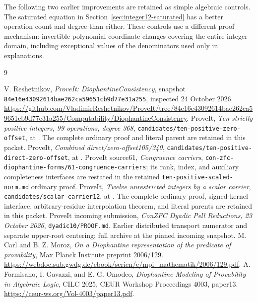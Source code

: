 \documentclass[11pt,letterpaper]{article}
\theoremstyle{remark}\newtheorem{remark}[theorem]{Remark}
\newcommand{\sha}{\texttt{84e16e43092614bae262ca59651cb9d77e31a255}}
\begin{document}
The following two earlier improvements are retained as simple algebraic
controls.  The saturated equation in Section~\ref{sec:integer12-saturated}
has a better operation count and degree than either.  These controls
use a different proof mechanism: invertible polynomial coordinate
changes covering the entire integer domain, including exceptional
values of the denominators used only in explanations.




\begin{thebibliography}{9}\raggedright
{} V. Reshetnikov, \emph{ProveIt: DiophantineConsistency},
snapshot \sha, inspected 24 October 2026.
\url{https://github.com/VladimirReshetnikov/ProveIt/tree/84e16e43092614bae262ca59651cb9d77e31a255/Computability/DiophantineConsistency}.
 ProveIt, \emph{Ten strictly positive integers, 99 operations,
degree 368}, \texttt{candidates/ten-positive-zero-offset}, at \cite{repo}.
The complete ordinary proof and literal parent are retained in this packet.
 ProveIt, \emph{Combined direct/zero-offset105/340},
\texttt{candidates/ten-positive-direct-zero-offset}, at \cite{repo}.
 ProveIt source61, \emph{Congruence carriers},
\texttt{con-zfc-diophantine-forms/61-congruence-carriers}; its rank,
index, and auxiliary completeness interfaces are restated in the retained
\texttt{ten-positive-scaled-norm.md} ordinary proof.
 ProveIt, \emph{Twelve unrestricted integers by a scalar carrier},
\texttt{candidates/scalar-carrier12}, at \cite{repo}.
The complete ordinary proof, signed-kernel interface, arbitrary-residue
interpolation theorem, and literal parents are retained in this packet.
 ProveIt incoming submission,
\emph{ConZFC Dyadic Pell Reductions, 23 October 2026},
\texttt{dyadic10/PROOF.md}.  Earlier distributed transport numerator and
separate upper-root centering; full archive at the pinned incoming snapshot.
 M. Carl and B. Z. Moroz,
\emph{On a Diophantine representation of the predicate of provability},
Max Planck Institute preprint 2006/129.
\url{https://webdoc.sub.gwdg.de/ebook/serien/e/mpi_mathematik/2006/129.pdf}.
 A. Formisano, I. Gavazzi, and E. G. Omodeo,
\emph{Diophantine Modeling of Provability in Algebraic Logic},
CILC 2025, CEUR Workshop Proceedings 4003, paper13.
\url{https://ceur-ws.org/Vol-4003/paper13.pdf}.
\end{thebibliography}
\end{document}

